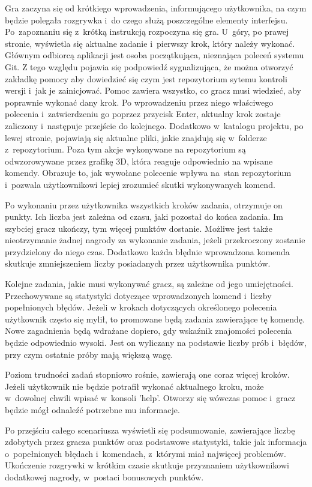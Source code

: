 \documentclass[12pt,a4paper,polish,thesis]{dcsbook}
\begin{document}
{	Gra zaczyna się od krótkiego wprowadzenia, informującego użytkownika, na czym będzie polegała rozgrywka i~do czego służą poszczególne elementy interfejsu. Po~zapoznaniu się z~krótką instrukcją rozpoczyna się gra. U~góry, po prawej stronie, wyświetla się aktualne zadanie i~pierwszy krok, który należy wykonać. Głównym odbiorcą aplikacji jest osoba początkująca, nieznająca poleceń systemu Git. Z tego względu pojawia się podpowiedź sygnalizująca,
	że można otworzyć zakładkę pomocy aby dowiedzieć się czym jest repozytorium sytemu kontroli wersji i~jak je zainicjować. 
	Pomoc zawiera wszystko, co gracz musi wiedzieć, aby poprawnie wykonać dany krok. Po wprowadzeniu przez niego właściwego polecenia i~zatwierdzeniu go poprzez przycisk Enter, aktualny krok zostaje zaliczony i~następuje przejście do kolejnego. Dodatkowo w~katalogu projektu, po lewej stronie, pojawiają się aktualne pliki, jakie znajdują się w~folderze z~repozytorium. Poza tym akcje wykonywane na repozytorium są odwzorowywane przez grafikę 3D, która reaguje odpowiednio na wpisane komendy. Obrazuje to, jak wywołane polecenie wpływa na~stan repozytorium i~pozwala użytkownikowi lepiej zrozumieć skutki wykonywanych komend.

	Po wykonaniu przez użytkownika wszystkich kroków zadania, otrzymuje on punkty. Ich liczba jest zależna od czasu, jaki pozostał do końca zadania. Im szybciej gracz ukończy, tym więcej punktów dostanie. Możliwe jest także nieotrzymanie żadnej nagrody za wykonanie zadania, jeżeli przekroczony zostanie przydzielony do niego czas. Dodatkowo każda błędnie wprowadzona komenda skutkuje zmniejszeniem liczby posiadanych przez użytkownika punktów.
	
	Kolejne zadania, jakie musi wykonywać gracz, są zależne od jego umiejętności. Przechowywane są statystyki dotyczące wprowadzonych komend i~liczby popełnionych błędów. Jeżeli w krokach dotyczących określonego polecenia użytkownik często się mylił, to promowane będą zadania zawierające tę komendę. Nowe zagadnienia będą wdrażane dopiero, gdy wskaźnik znajomości polecenia będzie odpowiednio wysoki. Jest on wyliczany na podstawie liczby prób i~błędów, przy czym ostatnie próby mają większą wagę.
	
	Poziom trudności zadań stopniowo rośnie, zawierają one coraz więcej kroków. Jeżeli użytkownik nie będzie potrafił wykonać aktualnego kroku, może w~dowolnej chwili wpisać w~konsoli 'help'. Otworzy się wówczas pomoc i~gracz będzie mógł odnaleźć potrzebne mu informacje.

	Po przejściu całego scenariusza wyświetli się podsumowanie, zawierające liczbę zdobytych przez gracza punktów oraz podstawowe statystyki, takie jak informacja o~popełnionych błędach i~komendach, z~którymi miał najwięcej problemów. Ukończenie rozgrywki w krótkim czasie skutkuje przyznaniem użytkownikowi dodatkowej nagrody, w~postaci bonusowych punktów.
	
}
\end{document}
